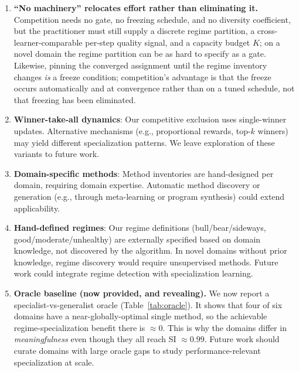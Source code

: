 \documentclass{article}
\begin{document}
\begin{enumerate}
    \item \textbf{``No machinery'' relocates effort rather than eliminating it.}
    Competition needs no gate, no freezing schedule, and no diversity coefficient,
    but the practitioner must still supply a discrete regime partition, a
    cross-learner-comparable per-step quality signal, and a capacity budget $K$;
    on a novel domain the regime partition can be as hard to specify as a gate.
    Likewise, pinning the converged assignment until the regime inventory changes
    \emph{is} a freeze condition; competition's advantage is that the freeze occurs
    automatically and at convergence rather than on a tuned schedule, not that
    freezing has been eliminated.

    \item \textbf{Winner-take-all dynamics}: Our competitive exclusion uses single-winner updates. Alternative mechanisms (e.g., proportional rewards, top-$k$ winners) may yield different specialization patterns. We leave exploration of these variants to future work.

    \item \textbf{Domain-specific methods}: Method inventories are hand-designed per domain, requiring domain expertise. Automatic method discovery or generation (e.g., through meta-learning or program synthesis) could extend applicability.

    \item \textbf{Hand-defined regimes}: Our regime definitions (bull/bear/sideways, good/moderate/unhealthy) are externally specified based on domain knowledge, not discovered by the algorithm. In novel domains without prior knowledge, regime discovery would require unsupervised methods. Future work could integrate regime detection with specialization learning.

    \item \textbf{Oracle baseline (now provided, and revealing).} We now report a
    specialist-vs-generalist oracle (Table~\ref{tab:oracle}). It shows that four
    of six domains have a near-globally-optimal single method, so the achievable
    regime-specialization benefit there is $\approx 0$. This is why the
    domains differ in \emph{meaningfulness} even though they all reach SI
    $\approx 0.99$. Future work should curate domains with large oracle gaps to
    study performance-relevant specialization at scale.
\end{enumerate}

\end{document}

